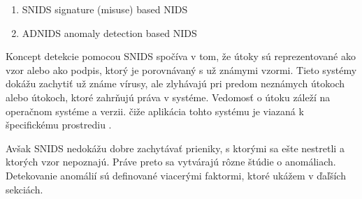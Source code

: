 \renewcommand{\labelenumi}{\roman{enumi}}
\begin{enumerate}
   \item SNIDS signature (misuse) based NIDS
    \item ADNIDS anomaly detection based NIDS
\end{enumerate}
Koncept detekcie pomocou SNIDS spočíva v tom, že útoky sú reprezentované ako vzor alebo ako podpis, ktorý je porovnávaný s už známymi vzormi. Tieto systémy dokážu zachytiť už známe vírusy, ale zlyhávajú pri predom neznámych útokoch alebo útokoch, ktoré zahrňujú práva v systéme. Vedomosť o útoku záleží na operačnom systéme a verzii. čiže aplikácia tohto systému je viazaná k špecifickému prostrediu .\cite{kumar}\par
Avšak SNIDS nedokážu dobre zachytávať prieniky, s ktorými sa ešte nestretli a ktorých vzor nepoznajú. Práve preto sa vytvárajú rôzne štúdie o anomáliach. Detekovanie anomálií sú definované viacerými faktormi, ktoré ukážem v ďaľších sekciách.
